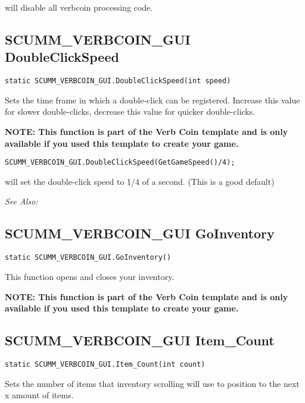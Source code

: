 will disable all verbcoin processing code.


\subsection{SCUMM_VERBCOIN_GUI DoubleClickSpeed}\label{SCUMM_VERBCOIN_GUI.DoubleClickSpeed}%

\begin{verbatim}
static SCUMM_VERBCOIN_GUI.DoubleClickSpeed(int speed)
\end{verbatim}
Sets the time frame in which a double-click can be registered. Increase this value
for slower double-clicks, decrease this value for quicker double-clicks.

\bf{NOTE:} This function is part of the Verb Coin template and is only available if
you used this template to create your game.

\begin{verbatim}
SCUMM_VERBCOIN_GUI.DoubleClickSpeed(GetGameSpeed()/4);
\end{verbatim}

will set the double-click speed to 1/4 of a second. (This is a good default)

\it{See Also:} 


\subsection{SCUMM_VERBCOIN_GUI GoInventory}\label{SCUMM_VERBCOIN_GUI.GoInventory}%

\begin{verbatim}
static SCUMM_VERBCOIN_GUI.GoInventory()
\end{verbatim}
This function opens and closes your inventory.

\bf{NOTE:} This function is part of the Verb Coin template and is only available if
you used this template to create your game.


\subsection{SCUMM_VERBCOIN_GUI Item_Count}\label{SCUMM_VERBCOIN_GUI.Item_Count}%

\begin{verbatim}
static SCUMM_VERBCOIN_GUI.Item_Count(int count)
\end{verbatim}
Sets the number of items that inventory scrolling will use to position to the next x amount of items.

